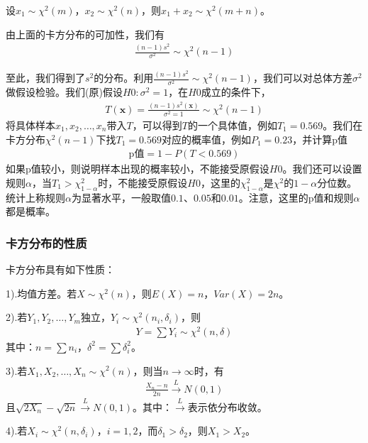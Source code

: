         \begin{lemma}[卡方分布的可加性]
        设$x_1\sim \chi^2(m)$，$x_2\sim \chi^2(n)$，则$x_1+x_2 \sim \chi^2(m+n)$。
        \end{lemma}
        \par
        由上面的卡方分布的可加性，我们有
        \begin{align*}
        \frac{(n-1)s^2}{\sigma^2} \sim \chi^2(n-1)
        \end{align*}
        \par
        至此，我们得到了$s^2$的分布。利用$\frac{(n-1)s^2}{\sigma^2} \sim \chi^2(n-1)$，我们可以对总体方差$\sigma^2$做假设检验。我们(原)假设$H0:\sigma^2 = 1$，在$H0$成立的条件下，
        \begin{align*}
        T(\mathbf{x}) = \frac{(n-1)s^2(\mathbf{x})}{\sigma^2 = 1} \sim \chi^2(n-1)
        \end{align*}
        将具体样本$x_1,x_2,\dots,x_n$带入$T$，可以得到$T$的一个具体值，例如$T_1 = 0.569$。我们在卡方分布$\chi^2(n-1)$下找$T_1= 0.569$对应的概率值，例如$P_1 =0.23$，并计算p值
        \begin{align*}
        \text{p值} = 1 - P(T < 0.569)
        \end{align*}
        如果p值较小，则说明样本出现的概率较小，不能接受原假设$H0$。我们还可以设置规则$\alpha$，当$T_1>\chi^2_{1-\alpha}$时，不能接受原假设$H0$，这里的$\chi^2_{1-\alpha}$是$\chi^2$的$1-\alpha$分位数。统计上称规则$\alpha$为显著水平，一般取值$0.1$、$0.05$和$0.01$。注意，这里的p值和规则$\alpha$都是概率。
        \subsubsection{卡方分布的性质}
            卡方分布具有如下性质：
            \par
            1).均值方差。若$X\sim \chi ^2(n)$，则$E(X) = n$，$Var(X) = 2n$。
            \par
            2).若$Y_1,Y_2,\dots,Y_m$独立，$Y_i \sim \chi ^2(n_i,\delta_i)$，则
            \begin{align*}
            Y = \sum Y_i \sim \chi^2(n,\delta)
            \end{align*}
            其中：$n = \sum n_i$，$\delta^2 = \sum \delta_i^2$。
            \par
            3).若$X_1,X_2,\dots,X_n\sim \chi ^2(n)$，则当$n\rightarrow\infty$时，有
            \begin{align*}
            \frac{X_n -n }{2n} \xrightarrow{L} N(0,1)
            \end{align*}
            且$\sqrt{2X_n}- \sqrt{2n} \xrightarrow{L}N(0,1)$。其中：$\xrightarrow{L}$表示依分布收敛。
            \par
            4).若$X_i \sim \chi^2(n,\delta_i)$，$i = 1,2$，而$\delta_1>\delta_2$，则$X_1>X_2$。


